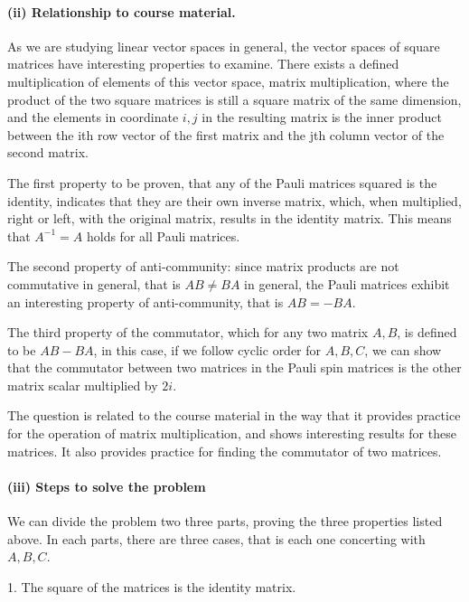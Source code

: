 \documentclass{article}
\begin{document}
\paragraph{(ii) Relationship to course material.} As we are studying linear vector spaces in general, the vector spaces of square matrices have interesting properties to examine. There exists a defined multiplication of elements of this vector space, matrix multiplication, where the product of the two square matrices is still a square matrix of the same dimension, and the elements in coordinate $i,j$ in the resulting matrix is the inner product between the ith row vector of the first matrix and the jth column vector of the second matrix. 

The first property to be proven, that any of the Pauli matrices squared is the identity, indicates that they are their own inverse matrix, which, when multiplied, right or left, with the original matrix, results in the identity matrix. This means that $A^{-1} = A$ holds for all Pauli matrices.

The second property of anti-community: since matrix products are not commutative in general, that is $AB \neq BA$ in general, the Pauli matrices exhibit an interesting property of anti-community, that is $AB = -BA$. 

The third property of the commutator, which for any two matrix $A, B$, is defined to be $AB - BA$, in this case, if we follow cyclic order for $A, B , C$, we can show that the commutator between two matrices in the Pauli spin matrices is the other matrix scalar multiplied by $2i$.

The question is related to the course material in the way that it provides practice for the operation of matrix multiplication, and shows interesting results for these matrices. It also provides practice for finding the commutator of two matrices. 

\paragraph{(iii) Steps to solve the problem}

We can divide the problem two three parts, proving the three properties listed above. In each parts, there are three cases, that is each one concerting with $A, B, C$.

1. The square of the matrices is the identity matrix.
\end{document}
